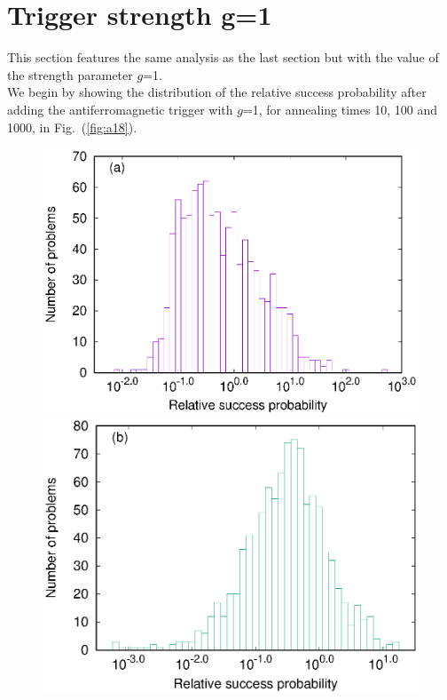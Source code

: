 \documentclass[../main.tex]{subfiles}
\begin{document}
\section{Trigger strength g=1}
This section features the same analysis as the last section but with the value of the strength parameter $g$=1.\\
We begin by showing the distribution of the relative success probability after adding the antiferromagnetic trigger with $g$=1, for annealing times 10, 100 and 1000, in Fig.~(\ref{fig:a18}).
\begin{figure}
\centering 
\includegraphics[scale=0.8]{A_T10_g1.eps}
\includegraphics[scale=0.8]{A_T100_g1.eps}

\end{figure}
\end{document}
